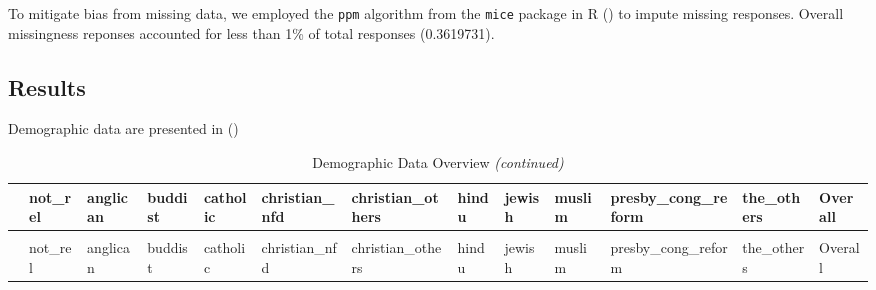 \documentclass[
  single column]{article}
\begin{document}
To mitigate bias from missing data, we employed the \texttt{ppm}
algorithm from the \texttt{mice} package in R
() to impute missing
responses. Overall missingness reponses accounted for less than 1\% of
total responses (0.3619731).

\subsection{Results}\label{results}

Demographic data are presented in
()

\newpage{}

\begin{landscape}



\begingroup\fontsize{5}{7}\selectfont

\begin{longtable}[t]{lllllllllllll}
\caption{Demographic Data Overview}\\
\toprule
  & not\_rel & anglican & buddist & catholic & christian\_nfd & christian\_others & hindu & jewish & muslim & presby\_cong\_reform & the\_others & Overall\\
\midrule
\endfirsthead
\caption[]{Demographic Data Overview \textit{(continued)}}\\
\toprule
  & not\_rel & anglican & buddist & catholic & christian\_nfd & christian\_others & hindu & jewish & muslim & presby\_cong\_reform & the\_others & Overall\\
\midrule
\endhead


\end{longtable}
\end{landscape}
\end{document}
